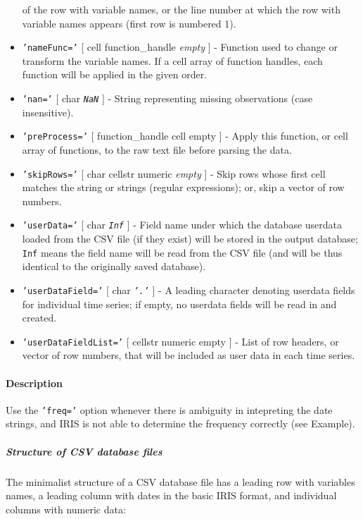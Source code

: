\begin{itemize}
  of the row with variable names, or the line number at which the row
  with variable names appears (first row is numbered 1).
\item
  \texttt{'nameFunc='} {[} cell \textbar{} function\_handle \textbar{}
  \emph{empty} {]} - Function used to change or transform the variable
  names. If a cell array of function handles, each function will be
  applied in the given order.
\item
  \texttt{'nan='} {[} char \textbar{} \emph{\texttt{NaN}} {]} - String
  representing missing observations (case insensitive).
\item
  \texttt{'preProcess='} {[} function\_handle \textbar{} cell \textbar{}
  empty {]} - Apply this function, or cell array of functions, to the
  raw text file before parsing the data.
\item
  \texttt{'skipRows='} {[} char \textbar{} cellstr \textbar{} numeric
  \textbar{} \emph{empty} {]} - Skip rows whose first cell matches the
  string or strings (regular expressions); or, skip a vector of row
  numbers.
\item
  \texttt{'userData='} {[} char \textbar{} \emph{\texttt{Inf}} {]} -
  Field name under which the database userdata loaded from the CSV file
  (if they exist) will be stored in the output database; \texttt{Inf}
  means the field name will be read from the CSV file (and will be thus
  identical to the originally saved database).
\item
  \texttt{'userDataField='} {[} char \textbar{} \emph{\texttt{'.'}} {]}
  - A leading character denoting userdata fields for individual time
  series; if empty, no userdata fields will be read in and created.
\item
  \texttt{'userDataFieldList='} {[} cellstr \textbar{} numeric
  \textbar{} empty {]} - List of row headers, or vector of row numbers,
  that will be included as user data in each time series.
\end{itemize}

\paragraph{Description}

Use the \texttt{'freq='} option whenever there is ambiguity in
intepreting the date strings, and IRIS is not able to determine the
frequency correctly (see Example).

\subparagraph{Structure of CSV database
files}

The minimalist structure of a CSV database file has a leading row with
variables names, a leading column with dates in the basic IRIS format,
and individual columns with numeric data:

